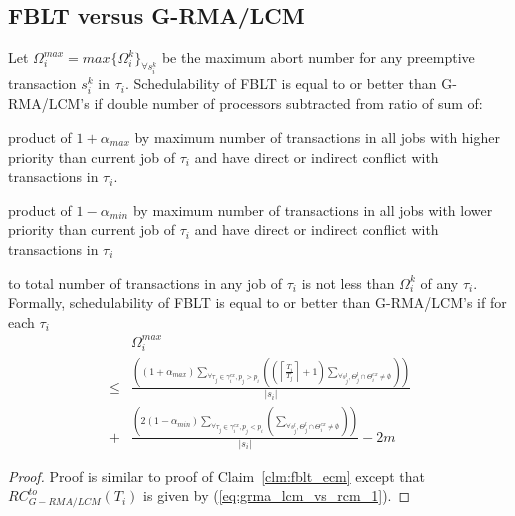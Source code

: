\subsection{FBLT versus G-RMA/LCM}\label{subsec:fblt_vs_grma_lcm}
%
\begin{clm}\label{clm:fblt_lcm_rma}
%
Let $\Omega_i^{max}=max\{\Omega_i^k\}_{\forall s_i^k}$ be the maximum abort number for any preemptive transaction $s_i^k$ in $\tau_i$. Schedulability of FBLT is equal to or better than G-RMA/LCM's if double number of processors subtracted from ratio of sum of:
%
\begin{compactitem}
\item product of $1+\alpha_{max}$ by maximum number of transactions in all jobs with higher priority than current job of $\tau_{i}$ and have direct or indirect conflict with transactions in $\tau_{i}$.
\item product of $1-\alpha_{min}$ by maximum number of transactions in all jobs with lower priority than current job of $\tau_{i}$ and have direct or indirect conflict with transactions in $\tau_{i}$
\end{compactitem}
%
to total number of transactions in any job of $\tau_i$ is not less than $\Omega_i^k$ of any $\tau_i$. Formally, schedulability of FBLT is equal to or better than G-RMA/LCM's if for each $\tau_i$ 
%
\begin{eqnarray}
 & \Omega_{i}^{max}\label{eq:fblt_grma_lcm_comp_4}\\
\le & \frac{\left(\left(1+\alpha_{max}\right)\sum_{\forall\tau_{j}\in\gamma_{i}^{ex},p_{j}>p_{i}}\left(\left(\left\lceil \frac{T_{i}}{T_{j}}\right\rceil +1\right)\sum_{\forall s_{j}^{l},\Theta_{j}^{l}\cap\Theta_{i}^{ex}\neq\emptyset}\right)\right)}{|s_{i}|}\nonumber \\
+ & \frac{\left(2\left(1-\alpha_{min}\right)\sum_{\forall\tau_{j}\in\gamma_{i}^{ex},p_{j}<p_{i}}\left(\sum_{\forall s_{j}^{l},\Theta_{j}^{l}\cap\Theta_{i}^{ex}\neq\emptyset}\right)\right)}{|s_{i}|}-2m\nonumber 
\end{eqnarray}
%
\end{clm}
%
\begin{proof}
%
Proof is similar to proof of Claim~\ref{clm:fblt_ecm} except that $RC_{G-RMA/LCM}^{to}(T_i)$ is given by (\ref{eq:grma_lcm_vs_rcm_1}).
%
\end{proof}
